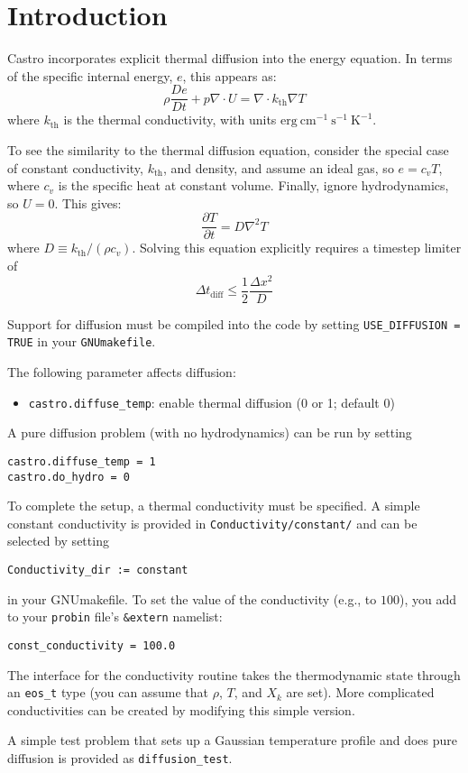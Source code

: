 \section{Introduction}

Castro incorporates explicit thermal diffusion into the energy equation.  
In terms of the specific internal energy, $e$, this appears as:
\begin{equation}
\rho \frac{De}{Dt} + p \nabla \cdot U = \nabla \cdot k_\mathrm{th} \nabla T
\end{equation}
where $k_\mathrm{th}$ is the thermal conductivity, with units
$\mathrm{erg~cm^{-1}~s^{-1}~K^{-1}}$.

To see the similarity to the thermal diffusion equation, consider the special
case of constant conductivity, $k_\mathrm{th}$, and density, and assume an
ideal gas, so $e = c_v T$, where $c_v$ is the specific heat at constant volume.
Finally, ignore hydrodynamics, so $U = 0$.  This gives:
\begin{equation}
\frac{\partial T}{\partial t} = D \nabla^2 T
\end{equation}
where $D \equiv k_\mathrm{th}/(\rho c_v)$.  Solving this equation explicitly requires
a timestep limiter of
\begin{equation}
\Delta t_\mathrm{diff} \le \frac{1}{2} \frac{\Delta x^2}{D}
\end{equation}

Support for diffusion must be compiled into the code by setting
{\tt USE\_DIFFUSION = TRUE} in your {\tt GNUmakefile}.


The following parameter affects diffusion:
\begin{itemize}
\item {\tt castro.diffuse\_temp}:  enable thermal diffusion (0 or 1; default 0)
\end{itemize}

A pure diffusion problem (with no hydrodynamics) can be run by setting
\begin{verbatim}
castro.diffuse_temp = 1
castro.do_hydro = 0
\end{verbatim}

To complete the setup, a thermal conductivity must be specified.
A simple constant conductivity is provided in {\tt Conductivity/constant/}
and can be selected by setting
\begin{verbatim}
Conductivity_dir := constant
\end{verbatim}
in your GNUmakefile.  To set the value of the conductivity (e.g., to
$100$), you add to your {\tt probin} file's {\tt \&extern} namelist:
\begin{verbatim}
const_conductivity = 100.0
\end{verbatim}


The interface for the conductivity routine takes
the thermodynamic state through an {\tt eos\_t} type (you can assume
that $\rho$, $T$, and $X_k$ are set).  More complicated conductivities
can be created by modifying this simple version.

A simple test problem that sets up a Gaussian temperature profile 
and does pure diffusion is provided as {\tt diffusion\_test}.

